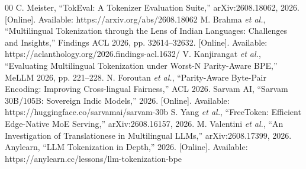 \documentclass[conference]{IEEEtran}
\begin{document}
\begin{thebibliography}{00}
 C. Meister, ``TokEval: A Tokenizer Evaluation Suite,'' arXiv:2608.18062, 2026. [Online]. Available: https://arxiv.org/abs/2608.18062
 M. Brahma \textit{et al.}, ``Multilingual Tokenization through the Lens of Indian Languages: Challenges and Insights,'' Findings ACL 2026, pp. 32614--32632. [Online]. Available: https://aclanthology.org/2026.findings-acl.1632/
 V. Kanjirangat \textit{et al.}, ``Evaluating Multilingual Tokenization under Worst-N Parity-Aware BPE,'' MeLLM 2026, pp. 221--228.
 N. Foroutan \textit{et al.}, ``Parity-Aware Byte-Pair Encoding: Improving Cross-lingual Fairness,'' ACL 2026.
 Sarvam AI, ``Sarvam 30B/105B: Sovereign Indic Models,'' 2026. [Online]. Available: https://huggingface.co/sarvamai/sarvam-30b
 S. Yang \textit{et al.}, ``FreeToken: Efficient Edge-Native MoE Serving,'' arXiv:2608.16157, 2026.
 M. Valentini \textit{et al.}, ``An Investigation of Translationese in Multilingual LLMs,'' arXiv:2608.17399, 2026.
 Anylearn, ``LLM Tokenization in Depth,'' 2026. [Online]. Available: https://anylearn.cc/lessons/llm-tokenization-bpe
\end{thebibliography}
\end{document}
